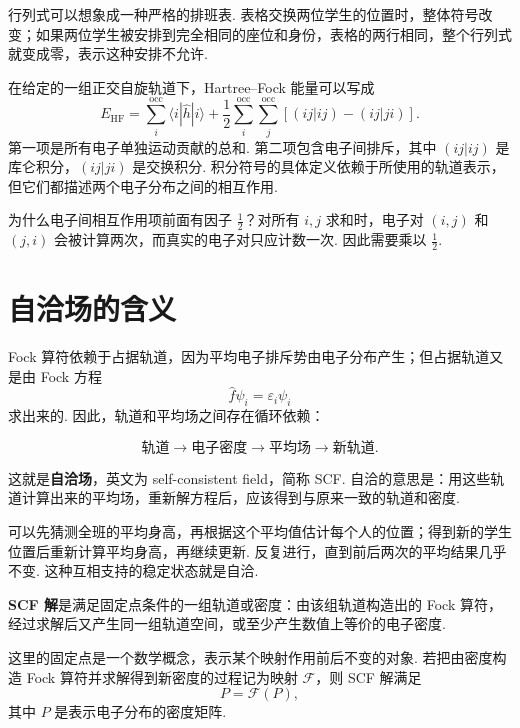 \documentclass[UTF8,11pt,a4paper,openany]{ctexbook}
\newcommand{\term}[1]{\textbf{#1}}
\begin{document}
\begin{analogybox}
行列式可以想象成一种严格的排班表. 表格交换两位学生的位置时，整体符号改变；如果两位学生被安排到完全相同的座位和身份，表格的两行相同，整个行列式就变成零，表示这种安排不允许. 
\end{analogybox}

在给定的一组正交自旋轨道下，Hartree--Fock 能量可以写成
\[
E_{\mathrm{HF}}
=
\sum_i^{\mathrm{occ}}\langle i|\hat h|i\rangle
+
\frac{1}{2}
\sum_i^{\mathrm{occ}}\sum_j^{\mathrm{occ}}
\left[
(ij|ij)-(ij|ji)
\right].
\]
第一项是所有电子单独运动贡献的总和. 第二项包含电子间排斥，其中 $(ij|ij)$ 是库仑积分，$(ij|ji)$ 是交换积分. 积分符号的具体定义依赖于所使用的轨道表示，但它们都描述两个电子分布之间的相互作用. 

\begin{derivationbox}
为什么电子间相互作用项前面有因子 $\frac12$？对所有 $i,j$ 求和时，电子对 $(i,j)$ 和 $(j,i)$ 会被计算两次，而真实的电子对只应计数一次. 因此需要乘以 $\frac12$. 
\end{derivationbox}

\section{自洽场的含义}

Fock 算符依赖于占据轨道，因为平均电子排斥势由电子分布产生；但占据轨道又是由 Fock 方程
\[
\hat f\psi_i=\varepsilon_i\psi_i
\]
求出来的. 因此，轨道和平均场之间存在循环依赖：

\[
\text{轨道}
\longrightarrow
\text{电子密度}
\longrightarrow
\text{平均场}
\longrightarrow
\text{新轨道}.
\]

这就是\term{自洽场}，英文为 self-consistent field，简称 SCF. 自洽的意思是：用这些轨道计算出来的平均场，重新解方程后，应该得到与原来一致的轨道和密度. 

\begin{analogybox}
可以先猜测全班的平均身高，再根据这个平均值估计每个人的位置；得到新的学生位置后重新计算平均身高，再继续更新. 反复进行，直到前后两次的平均结果几乎不变. 这种互相支持的稳定状态就是自洽. 
\end{analogybox}

\begin{definitionbox}
\term{SCF 解}是满足固定点条件的一组轨道或密度：由该组轨道构造出的 Fock 算符，经过求解后又产生同一组轨道空间，或至少产生数值上等价的电子密度. 
\end{definitionbox}

这里的固定点是一个数学概念，表示某个映射作用前后不变的对象. 若把由密度构造 Fock 算符并求解得到新密度的过程记为映射 $\mathcal F$，则 SCF 解满足
\[
P=\mathcal F(P),
\]
其中 $P$ 是表示电子分布的密度矩阵. 
\end{document}
